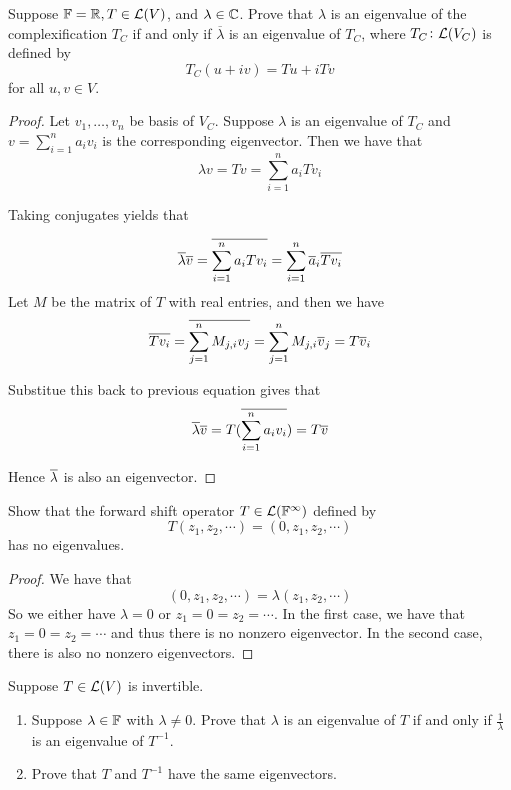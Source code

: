 \documentclass{extarticle}
\begin{document}
\begin{problem}{18}
    Suppose \(\mathbb{F} = \mathbb{R}, T \in \mathcal{L}(V)\), and \(\lambda \in \mathbb{C}\). Prove that \(\lambda\) is 
    an eigenvalue of the complexification \(T_C\) if and only if \(\overline{\lambda}\) 
    is an eigenvalue of \(T_C\), where \(T_C \colon \mathcal{L}(V_C)\) is defined by 
    \[T_C(u + iv) = Tu + iTv\]
    for all \(u, v \in V\).
\end{problem}

\begin{proof} Let \(v_1, \ldots, v_n\) be basis of \(V_C\).
Suppose \(\lambda\) is an eigenvalue of \(T_C\) and \(v = \sum_{i=1}^{n}a_i v_i\) is the 
corresponding eigenvector. Then we have that 
\[\lambda v = Tv = \sum_{i=1}^{n}a_i T v_i\] 

Taking conjugates yields that 

\[\overline{\lambda} \overline{v} = \overline{\sum_{i=1}^{n} a_i T v_i} = \sum_{i=1}^{n} \overline{a}_i \overline{T v_i}\]
Let \(M\) be the matrix of \(T\) with real entries, and then we have 
\[\overline{Tv_i} = \overline{\sum_{j=1}^{n}M_{j, i} v_j} = \sum_{j=1}^{n}M_{j, i} \overline{v}_j 
= T \overline{v}_i\]

Substitue this back to previous equation gives that 
\[\overline{\lambda} \overline{v} = T(\overline{\sum_{i=1}^{n} a_i v_i}) = T \overline{v} \]

Hence \(\overline{\lambda}\) is also an eigenvector. 
\end{proof}


\begin{problem}{19}
    Show that the forward shift operator \(T \in \mathcal{L}(\mathbb{F}^\infty)\) defined by 
    \[T(z_1, z_2, \cdots) = (0, z_1, z_2, \cdots)\]
    has no eigenvalues. 
\end{problem}

\begin{proof}
We have that 
\[(0, z_1, z_2, \cdots) = \lambda (z_1, z_2, \cdots)\]
So we either have \(\lambda =0\) or \(z_1 = 0 = z_2 = \cdots\). In the first case, we have 
that \(z_1 = 0 = z_2 = \cdots\) and thus there is no nonzero eigenvector. In the second case, 
there is also no nonzero eigenvectors. 
\end{proof}



\begin{problem}{21}
    Suppose \(T \in \mathcal{L}(V)\) is invertible. 
    \begin{enumerate}[label=(\alph*)]
        \item Suppose \(\lambda \in \mathbb{F}\) with \(\lambda \neq 0\). Prove that 
        \(\lambda\) is an eigenvalue of \(T\) if and only if \(\frac{1}{\lambda}\) 
        is an eigenvalue of \(T^{-1}\). 

        \item Prove that \(T\) and \(T^{-1}\) have the same eigenvectors. 
    \end{enumerate}
\end{problem}
\end{document}
